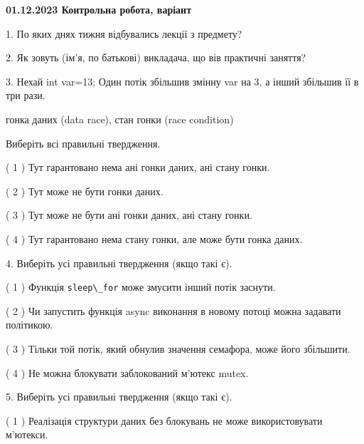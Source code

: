 \documentclass[12pt, ukrainian]{article}
\def\code#1{\Verb!#1!}
\begin{document}
\vspace{4mm}
\newpage
\begin {large}

\textbf{01.12.2023 Контрольна робота, варіант  }\par


{
1. По яких днях тижня відбувались лекції з предмету?



\vspace{5mm}
2. Як зовуть (ім'я, по батькові) викладача, що вів практичні заняття?



\vspace{5mm}
3. Нехай int var=13; Один потік збільшив змінну var на 3, а інший збільшив її в три рази.

гонка даних (data race), стан гонки (race condition)

Виберіть всі правильні твердження.\par
\vspace{2mm}
( 1 ) Тут гарантовано нема ані гонки даних, ані стану гонки.%

( 2 ) Тут може не бути гонки даних.%

( 3 ) Тут може не бути ані гонки даних, ані стану гонки.%

( 4 ) Тут гарантовано нема стану гонки, але може бути гонка даних.%


\vspace{5mm}
4. Виберіть усі правильні твердження (якщо такі є).\par
\vspace{2mm}

( 1 ) Функція \code{sleep\_for} може змусити інший потік заснути.%

( 2 ) Чи запустить функція  async виконання в новому потоці можна задавати політикою.%

( 3 ) Тільки той потік, який обнулив значення семафора, може його збільшити.%

( 4 ) Не можна блокувати заблокований м’ютекс mutex.%


\vspace{5mm}
5. Виберіть усі правильні твердження (якщо такі є).\par
\vspace{2mm}

( 1 ) Реалізація структури даних без блокувань не може використовувати м’ютекси.%

}
\end{large}
\end{document}
